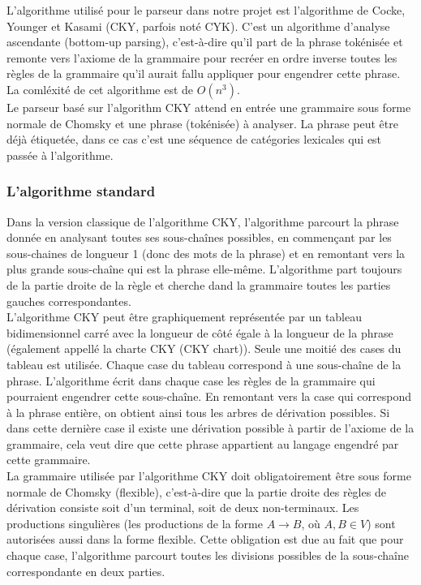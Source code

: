 \documentclass[12pt]{article}
\begin{document}
L'algorithme utilisé pour le parseur dans notre projet est l'algorithme de
Cocke, Younger et Kasami (CKY, parfois noté CYK). C'est un algorithme d'analyse
ascendante (bottom-up parsing), c'est-à-dire qu'il part de la phrase tokénisée
et remonte vers l'axiome de la grammaire pour recréer en ordre inverse toutes les règles de la grammaire qu'il
aurait fallu appliquer pour engendrer cette phrase. La comléxité de cet
algorithme est de $O(n^3)$. \\

Le parseur basé sur l'algorithm CKY attend en entrée une grammaire sous forme
normale de Chomsky et une phrase (tokénisée) à analyser. La phrase peut être
déjà étiquetée, dans ce cas c'est une séquence de catégories lexicales qui est
passée à l'algorithme.

\subsubsection{L'algorithme standard}
Dans la version classique de l'algorithme CKY, l'algorithme parcourt la phrase
donnée en analysant toutes ses sous-chaînes possibles, en commençant par les
sous-chaines de longueur 1 (donc des mots de la phrase) et en remontant vers la
plus grande sous-chaîne qui est la phrase elle-même. L'algorithme
part toujours de la partie droite de la règle et cherche dand la
grammaire toutes les parties gauches correspondantes. \\

L'algorithme CKY peut
être graphiquement représentée par un tableau bidimensionnel carré avec la longueur de côté égale à la longueur de la phrase (également appellé la charte CKY (CKY chart)).
Seule une moitié des cases du tableau est utilisée. Chaque case du tableau correspond à une sous-chaîne de la phrase.
L'algorithme écrit dans chaque case les règles de la grammaire qui pourraient
engendrer cette sous-chaîne. En remontant vers la case qui correspond à la
phrase entière, on obtient ainsi tous les arbres de dérivation possibles. Si
dans cette dernière case il existe une dérivation possible à partir de l'axiome
de la grammaire, cela veut dire que cette phrase appartient au langage engendré
par cette grammaire.\\

La grammaire utilisée par l'algorithme CKY doit obligatoirement être sous forme
normale de Chomsky (flexible), c'est-à-dire que la partie droite des règles de
dérivation consiste soit d'un terminal, soit de deux non-terminaux. Les productions
singulières (les productions de la forme $A \rightarrow B$, où $A,B \in V$) sont
autorisées aussi dans la forme flexible. Cette obligation est
due au fait que pour chaque case, l'algorithme parcourt toutes les divisions possibles de la sous-chaîne
correspondante en deux parties. \\
\end{document}
